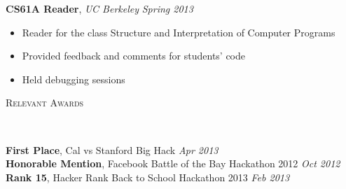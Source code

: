 \documentclass[9pt]{article}
\newenvironment{changemargin}[2]{%
  \begin{list}{}{%
      \setlength{\topsep}{0pt}%
      \setlength{\leftmargin}{#1}%
      \setlength{\rightmargin}{#2}%
      \setlength{\listparindent}{\parindent}%
      \setlength{\itemindent}{\parindent}%
      \setlength{\parsep}{\parskip}%
    }%
  \item[]}{\end{list}
}
\newcommand{\lineover}{
  \begin{changemargin}{-0.05in}{-0.05in}
    \vspace*{-8pt}
    \hrulefill \\
    \vspace*{-2pt}
  \end{changemargin}
}
\newcommand{\header}[1]{
  \begin{changemargin}{-0.5in}{-0.5in}
    \scshape{#1}\\
    \lineover
  \end{changemargin}
}
\newenvironment{body} {
  \vspace*{-16pt}
  \begin{changemargin}{-0.25in}{-0.5in}
  }	
  {\end{changemargin}
}
\begin{document}
\begin{body}
  \vspace{14pt}
  \textbf{CS61A Reader}, \emph{UC Berkeley} \hfill \emph{Spring 2013}\\
  \vspace*{-4pt}
  \begin{itemize} \itemsep -0pt  %
  \item Reader for the class Structure and Interpretation of Computer Programs
  \item Provided feedback and comments for students' code
  \item Held debugging sessions
  \end{itemize}
\end{body}

\smallskip


\header{Relevant Awards}

\begin{body}
  \vspace{14pt}
  \textbf{First Place}, Cal vs Stanford Big Hack \hfill{} \emph{Apr 2013}\\
  \textbf{Honorable Mention}, Facebook Battle of the Bay Hackathon 2012 \hfill{} \emph{Oct 2012}\\
  \textbf{Rank 15}, Hacker Rank Back to School Hackathon 2013 \hfill{} \emph{Feb 2013}\\  
\end{body}
\end{document}
